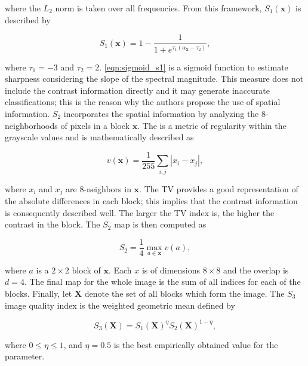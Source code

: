 \noindent where the $L_{2}$ norm is taken over all frequencies. From this framework, $S_{1}(\mathbf{x})$ is described by

\begin{equation}
\label{eqn:sigmoid_s1}
S_{1}(\mathbf{x}) = 1 - \frac{1}{1 + e^{\tau_{1}
(\alpha_{\mathbf{x}} - \tau_{2})}},
\end{equation}

\noindent where $\tau_{1} = -3$ and $\tau_{2} = 2$. \autoref{eqn:sigmoid_s1} is a sigmoid function to estimate sharpness considering the slope of the spectral magnitude. This measure does not include the contrast information directly and it may generate inaccurate classifications; this is the reason why the authors propose the use of spatial information. $S_{2}$ incorporates the spatial information by analyzing the 8-neighborhoods of pixels in a block $\mathbf{x}$. The  is a metric of regularity within the grayscale values and is mathematically described as

\begin{equation}
\label{eqn:total_variation}
v(\mathbf{x}) = \frac{1}{255}\sum_{i,j}\left|x_{i} - x_{j}\right|,
\end{equation}

\noindent where $x_{i}$ and $x_{j}$ are 8-neighbors in $\mathbf{x}$. The TV provides a good representation of the absolute differences in each block; this implies that the contrast information is consequently described well. The larger the TV index is, the higher the contrast in the block. The $S_{2}$ map is then computed as

\begin{equation}
\label{eqn:spatial_s2}
S_{2} = \frac{1}{4} \max_{a \in \mathbf{x}} v(a),
\end{equation}

\noindent where $a$ is a $2 \times 2$ block of $\mathbf{x}$. Each $x$ is of dimensions $8 \times 8$ and the overlap is $d = 4$. The final map for the whole image is the sum of all indices for each of the blocks. Finally, let $\mathbf{X}$ denote the set of all blocks which form the image. The $S_{3}$ image quality index is the weighted geometric mean defined by

\begin{equation}
\label{eqn:s3_index}
S_{3}(\mathbf{X}) = S_{1}(\mathbf{X})^{\eta} S_{2}(\mathbf{X})^{1 - \eta},
\end{equation}

\noindent where $0 \leq \eta \leq 1$, and $\eta = 0.5$ is the best empirically obtained value for the parameter.

